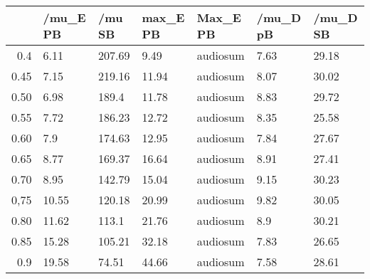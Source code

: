 \begin{table}[ht]
\centering
\begin{tabular}{rllllll}
  \hline
 & /mu\_E PB & /mu SB & max\_E PB & Max\_E PB & /mu\_D pB & /mu\_D SB \\ 
  \hline
0.4 & 6.11 & 207.69 & 9.49 & audiosum & 7.63 & 29.18 \\ 
  0.45 & 7.15 & 219.16 & 11.94 & audiosum & 8.07 & 30.02 \\ 
  0.50 & 6.98 & 189.4 & 11.78 & audiosum & 8.83 & 29.72 \\ 
  0.55 & 7.72 & 186.23 & 12.72 & audiosum & 8.35 & 25.58 \\ 
  0.60 & 7.9 & 174.63 & 12.95 & audiosum & 7.84 & 27.67 \\ 
  0.65 & 8.77 & 169.37 & 16.64 & audiosum & 8.91 & 27.41 \\ 
  0.70 & 8.95 & 142.79 & 15.04 & audiosum & 9.15 & 30.23 \\ 
  0,75 & 10.55 & 120.18 & 20.99 & audiosum & 9.82 & 30.05 \\ 
  0.80 & 11.62 & 113.1 & 21.76 & audiosum & 8.9 & 30.21 \\ 
  0.85 & 15.28 & 105.21 & 32.18 & audiosum & 7.83 & 26.65 \\ 
  0.9 & 19.58 & 74.51 & 44.66 & audiosum & 7.58 & 28.61 \\ 
   \hline
\end{tabular}
\end{table}
